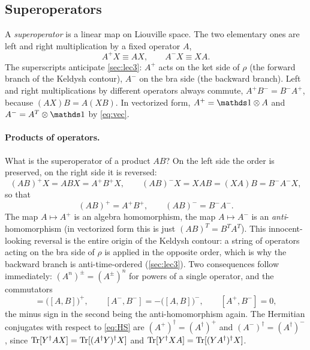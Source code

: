 \subsection{Superoperators}

A \emph{superoperator} is a linear map on Liouville space.
The two elementary ones are left and right multiplication by a fixed operator $A$,
\begin{equation}
  A^{+}X\equiv AX,\qquad A^{-}X\equiv XA .
  \label{eq:leftright}
\end{equation}
The superscripts anticipate \cref{sec:lec3}: $A^+$ acts on the ket side of $\rho$ (the forward branch of the Keldysh contour), $A^-$ on the bra side (the backward branch).
Left and right multiplications by different operators always commute, $A^+B^-=B^-A^+$, because $(AX)B=A(XB)$.
In vectorized form, $A^+=\Id\otimes A$ and $A^-=A^T\otimes\Id$ by \cref{eq:vec}.

\paragraph{Products of operators.}
What is the superoperator of a product $AB$?
On the left side the order is preserved, on the right side it is reversed:
\begin{equation}
  (AB)^{+}X=ABX=A^{+}B^{+}X,\qquad
  (AB)^{-}X=XAB=(XA)B=B^{-}A^{-}X,
\end{equation}
so that
\begin{equation}
  \boxed{\;(AB)^{+}=A^{+}B^{+},\qquad (AB)^{-}=B^{-}A^{-}.\;}
  \label{eq:product-rule}
\end{equation}
The map $A\mapsto A^+$ is an algebra homomorphism, the map $A\mapsto A^-$ is an \emph{anti}-homomorphism (in vectorized form this is just $(AB)^T=B^TA^T$).
This innocent-looking reversal is the entire origin of the Keldysh contour: a string of operators acting on the bra side of $\rho$ is applied in the opposite order, which is why the backward branch is anti-time-ordered (\cref{sec:lec3}).
Two consequences follow immediately: $(A^n)^\pm=(A^\pm)^n$ for powers of a single operator, and the commutators
\begin{equation}
  [A^{+},B^{+}]=\big([A,B]\big)^{+},\qquad [A^{-},B^{-}]=-\big([A,B]\big)^{-},\qquad [A^{+},B^{-}]=0 ,
  \label{eq:super-commutators}
\end{equation}
the minus sign in the second being the anti-homomorphism again.
The Hermitian conjugates with respect to \cref{eq:HS} are $(A^{+})^\dagger=(A^\dagger)^{+}$ and $(A^{-})^\dagger=(A^\dagger)^{-}$, since $\operatorname{Tr}[Y^\dagger AX]=\operatorname{Tr}[(A^\dagger Y)^\dagger X]$ and $\operatorname{Tr}[Y^\dagger XA]=\operatorname{Tr}[(YA^\dagger)^\dagger X]$.

